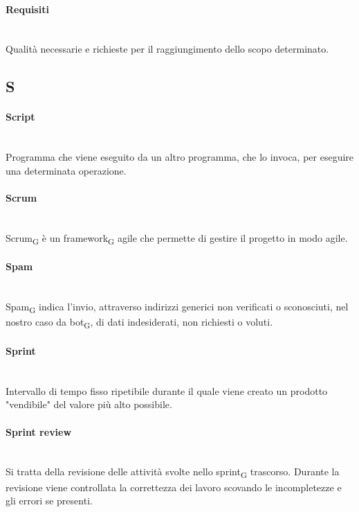 \paragraph{Requisiti}~\smallskip \\
Qualità necessarie e richieste per il raggiungimento dello scopo determinato.
\newpage
{}
\subsection*{S}
\paragraph{Script}~\smallskip \\
Programma che viene eseguito da un altro programma, che lo invoca, per eseguire una determinata operazione.

\paragraph{Scrum}~\smallskip \\
Scrum\textsubscript{G} è un framework\textsubscript{G} agile che permette di gestire il progetto in modo agile.

\paragraph{Spam}~\smallskip \\
Spam\textsubscript{G} indica l'invio, attraverso indirizzi generici non verificati o sconosciuti, nel nostro caso da bot\textsubscript{G}, di dati indesiderati, non richiesti o voluti.

\paragraph{Sprint}~\smallskip \\
Intervallo di tempo fisso ripetibile durante il quale viene creato un prodotto "vendibile" del valore più alto possibile.

\paragraph{Sprint review}~\smallskip \\
Si tratta della revisione delle attività svolte nello sprint\textsubscript{G} trascorso. Durante la revisione viene controllata la correttezza
dei lavoro scovando le incompletezze e gli errori se presenti.

